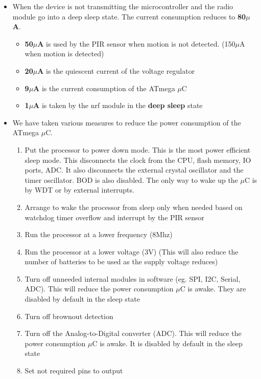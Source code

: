 \begin{itemize}	
\item When the device is not transmitting the microcontroller and the radio module go into a deep sleep state. The current consumption reduces to \textbf{80$\mu$A}. 
\begin{itemize}
	\item \textbf{50$\mu$A} is used by the PIR sensor when motion is not detected. (150$\mu$A when motion is detected)
	\item \textbf{20$\mu$A} is the quiescent current of the voltage regulator
	\item \textbf{9$\mu$A} is the current consumption of the ATmega $\mu$C
	\item \textbf{1$\mu$A} is taken by the nrf module in the \textbf{deep sleep} state
\end{itemize}

\item We have taken various measures to reduce the power consumption of the ATmega $\mu$C.
	\begin{enumerate}
		\item Put the processor to power down mode. This is the most power efficient sleep mode. This disconnects the clock from the CPU, flash memory, IO ports, ADC. It also disconnects the external crystal oscillator and the timer oscillator. BOD is also disabled. The only way to wake up the $\mu$C is by WDT or by external interrupts.
		\item Arrange to wake the processor from sleep only when needed based on watchdog timer overflow and interrupt by the PIR sensor
		\item Run the processor at a lower frequency (8Mhz)
		\item Run the processor at a lower voltage (3V) (This will also reduce the number of batteries to be used as the supply voltage reduces)
		\item Turn off unneeded internal modules in software (eg. SPI, I2C, Serial, ADC). This will reduce the power consumption $\mu$C is awake. They are disabled by default in the sleep state
		\item Turn off brownout detection
		\item Turn off the Analog-to-Digital converter (ADC). This will reduce the power consumption $\mu$C is awake. It is disabled by default in the sleep state
		\item Set not required pins to output
	\end{enumerate} 


\end{itemize}
